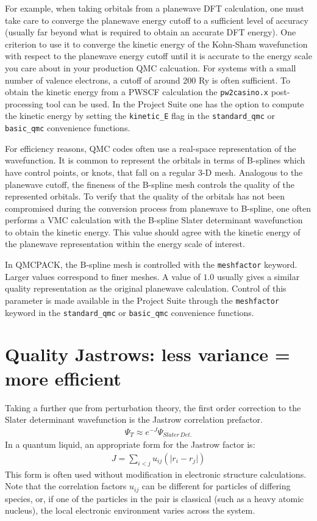 \documentclass[oneside,11pt]{memoir}
\numberwithin{equation}{section}
\newcommand{\abs}[1]{\lvert #1 \rvert}
\begin{document}
For example, when taking orbitals from a planewave DFT calculation, one must 
take care to converge the planewave energy cutoff to a sufficient level of 
accuracy (usually far beyond what is required to obtain an accurate DFT 
energy).  One criterion to use it to converge the kinetic energy of the 
Kohn-Sham wavefunction with respect to the planewave energy cutoff until it 
is accurate to the energy scale you care about in your production QMC 
calcuation.  For systems with a small number of valence electrons, a cutoff of 
around 200 Ry is often sufficient.  To obtain the kinetic energy from a PWSCF 
calculation the \texttt{pw2casino.x} post-processing tool can be used.  In 
the Project Suite one has the option to compute the kinetic energy by setting 
the \texttt{kinetic\_E} flag in the \texttt{standard\_qmc} or 
\texttt{basic\_qmc} convenience functions. 

For efficiency reasons, QMC codes often use a real-space representation of the 
wavefunction.  It is common to represent the orbitals in terms of B-splines 
which have control points, or knots, that fall on a regular 3-D mesh.  
Analogous to the planewave cutoff, the fineness of the B-spline mesh controls 
the quality of the represented orbitals.  To verify that the quality of the 
orbitals has not been compromised during the conversion process from planewave 
to B-spline, one often performs a VMC calculation with the B-spline Slater 
determinant wavefunction to obtain the kinetic energy.  This value should agree 
with the kinetic energy of the planewave representation within the energy scale 
of interest.  

In QMCPACK, the B-spline mesh is controlled with the \texttt{meshfactor} 
keyword.  Larger values correspond to finer meshes.  A value of $1.0$ usually 
gives a similar quality representation as the original planewave calculation. 
Control of this parameter is made available in the Project Suite through the 
\texttt{meshfactor} keyword in the \texttt{standard\_qmc} or 
\texttt{basic\_qmc} convenience functions. 


\section{Quality Jastrows: less variance = more efficient}
Taking a further que from perturbation theory, the first order correction to 
the Slater determinant wavefunction is the Jastrow correlation prefactor.  
\begin{align}
  \Psi_T\approx e^{-J}\Psi_{Slater\, Det.}
\end{align}
In a quantum liquid, an appropriate form for the Jastrow factor is:
\begin{align}
  J = \sum_{i<j} u_{ij}(\abs{r_i-r_j})
\end{align}
This form is often used without modification in electronic structure 
calculations.  Note that the correlation factors $u_{ij}$ can be different for 
particles of differing species, or, if one of the particles in the pair is 
classical (such as a heavy atomic nucleus), the local electronic environment 
varies across the system.
\end{document}
